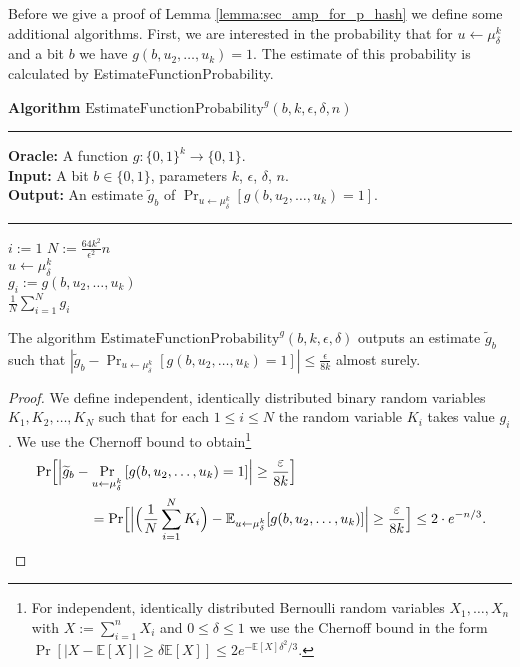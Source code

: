 Before we give a proof of Lemma \ref{lemma:sec_amp_for_p_hash} we define some additional algorithms.
First, we are interested in the probability that for $u \leftarrow \mu_{\delta}^k$ and a bit $b$ we have $g(b,u_2, \dotsc, u_k) = 1$.
The estimate of this probability is calculated by EstimateFunctionProbability.
%
\begin{codeblock}
  \textbf{Algorithm} $\text{EstimateFunctionProbability}^{g}(b, k, \epsilon, \delta, n)$
  \medskip
  \hrule
  \medskip
  \textbf{Oracle:} A function $g : \{0,1\}^{k} \rightarrow \{0,1\}$.\\
  \textbf{Input:} A bit $b \in \{0,1\}$, parameters $k$, $\epsilon$, $\delta$, $n$. \\
  \textbf{Output:} An estimate $\widetilde{g}_b$ of $\Pr_{u \leftarrow \mu_{\delta}^{k}}[g(b,u_2, \dotsc, u_k) = 1]$.
  \medskip\hrule\medskip
  \For $i:=1$ \To $N := \frac{64k^2}{\epsilon^2} n$ \Do \\
  \IndI $u \leftarrow \mu_{\delta}^{k}$ \\
  \IndI $g_i := g(b, u_2, \dotsc, u_k)$ \\
  \Return $\frac{1}{N} \sum_{i=1}^{N} g_i$
\end{codeblock}
%
\begin{lemma}
  \label{lemma:estimate_of_g}
  The algorithm $\text{EstimateFunctionProbability}^{g}(b, k, \epsilon, \delta)$ outputs an estimate $\widetilde{g}_b$
  such that $| \widetilde{g}_b - \Pr_{u \leftarrow \mu_{\delta}^{k}}\left[g(b,u_2, \dots, u_k) = 1\right] | \leq \frac{\epsilon}{8k}$ almost surely.
\end{lemma}
%
\begin{proof}
We define independent, identically distributed binary random variables $K_1, K_2, \dots, K_N$
such that for each $1 \leq i \leq N$
the random variable $K_i$ takes value $g_i$. We use the Chernoff bound to obtain\footnote{For independent, identically distributed Bernoulli
random variables $X_1, \dots, X_n$ with $X := \sum_{i=1}^n X_i$ and $0 \leq \delta \leq 1$
we use the Chernoff bound in the form $\Pr[|X - \mathbb{E}[X]| \geq \delta \mathbb{E}[X]] \leq 2 e^{- \mathbb{E}[X] \delta^2 / 3}$.}
%
\begin{align*}
  &\Pr \Bigl[ \Bigl| \widetilde{g}_b - \Pr_{u \leftarrow \mu_{\delta}^{k}}\left[g(b,u_2, \dots, u_k) = 1\right] \Bigr| \geq \frac{\varepsilon}{8k} \Bigr]\\
  &\mbox\qquad\qquad = \Pr \Bigl[\Bigl|\Bigl(\frac{1}{N} \sum_{i=1}^N K_i \Bigr) - \mathbb{E}_{u \leftarrow \mu_{\delta}^k}[g(b,u_2, \dots, u_k)]\Bigr|
    \geq \frac{\varepsilon}{8k} \Bigr] \leq 2 \cdot e^{-n/3}.
\end{align*}
\end{proof}
